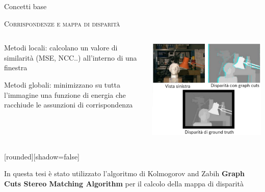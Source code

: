 \documentclass{beamer}
\begin{document}
\begin{section}{Concetti base}
\begin{frame}[t]{\textsc{Corrispondenze e mappa di disparit\`{a}}}
\begin{columns}
\begin{column}{5cm}
\vspace{1em}
\begin{itemize}
\item \small{Metodi locali: calcolano un valore di similarit\`{a} (MSE, NCC..) all'interno di una finestra  
\item Metodi globali: minimizzano su tutta l'immagine una funzione di energia che racchiude le assunzioni di corrispondenza
}
\end{itemize}
\end{column}
\begin{column}{5cm}
\vspace{1.5em}
\centering
\includegraphics[width=1\linewidth]{./img/gc.png}
\end{column}
\end{columns}
\vspace{-1em}
\begin{center}
	[rounded][shadow=false]
\begin{block}{}
\center \small{In questa tesi \`{e} stato utilizzato l'algoritmo di Kolmogorov and Zabih \textbf{Graph Cuts Stereo Matching Algorithm} per il calcolo della mappa di disparit\`{a}}
\end{block}
\end{center}
\end{frame}


\end{section}
\end{document}
